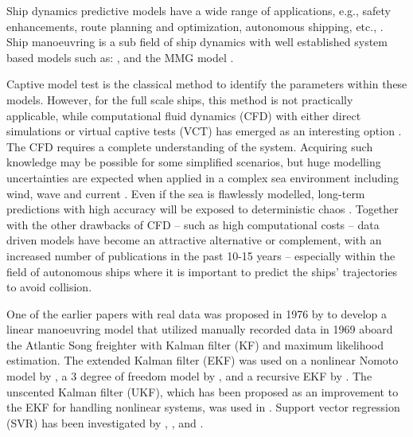 Ship dynamics predictive models have a wide range of applications, e.g., safety enhancements, route planning and optimization, autonomous shipping, etc., \citep{aslam_internet_2020}.
Ship manoeuvring is a sub field of ship dynamics with well established system based models such as: \citet{abkowitz_ship_1964,nomoto_steering_1957,norrbin_theory_1971}, and the MMG model \citep{yasukawa_introduction_2015}.

Captive model test is the classical method to identify the parameters within these models. However, for the full scale ships, this method is not practically applicable, while computational fluid dynamics (CFD) with either direct simulations or virtual captive tests (VCT) has emerged as an interesting option \citep{liu_predictions_2018,li_ship_2022}.
The CFD requires a complete understanding of the system. Acquiring such knowledge may be possible for some simplified scenarios, but huge modelling uncertainties are expected when applied in a complex sea environment including wind, wave and current \citep{miller_ship_2021}. 
Even if the sea is flawlessly modelled, long-term predictions with high accuracy will be exposed to deterministic chaos \citep{lorenz_deterministic_1963}.
Together with the other drawbacks of CFD -- such as high computational costs -- data driven models have become an attractive alternative or complement, with an increased number of publications in the past 10-15 years %
-- especially within the field of autonomous ships \citep{ahmed_survey_2023} where it is important to predict the ships’ trajectories to avoid collision. 



One of the earlier papers with real data was proposed in 1976 by \citet{astrom_identification_1976} to develop a linear manoeuvring model that utilized manually recorded data in 1969 aboard the Atlantic Song freighter with Kalman filter (KF) and maximum likelihood estimation. 
The extended Kalman filter (EKF) was used on a nonlinear Nomoto model by \citet{perera_system_2015}, a 3 degree of freedom model by \citet{shi_identification_2009}, and a recursive EKF by \citet{alexandersson_system_2022}.
The unscented Kalman filter (UKF), which has been proposed as an improvement to the EKF for handling nonlinear systems, was used in \citet{revestido_herrero_two-step_2012}.
Support vector regression (SVR) has been investigated by \citet{luo_parameter_2016}, \citet{zhu_parameter_2017}, and \citet{wang_parameter_2021}. 

